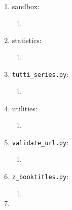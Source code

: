 \begin{enumerate}
	\begin{enumerate} \itemsep -2pt
	\item 
	\end{enumerate}
\item sandbox: \vspace{-0.3cm}
	\begin{enumerate} \itemsep -2pt
	\item 
	\end{enumerate}
\item statistics: \vspace{-0.3cm}
	\begin{enumerate} \itemsep -2pt
	\item 
	\end{enumerate}
\item {\tt tutti\_series.py}: \vspace{-0.3cm}
	\begin{enumerate} \itemsep -2pt
	\item 
	\end{enumerate}
\item utilities: \vspace{-0.3cm}
	\begin{enumerate} \itemsep -2pt
	\item 
	\end{enumerate}
\item {\tt validate\_url.py}: \vspace{-0.3cm}
	\begin{enumerate} \itemsep -2pt
	\item 
	\end{enumerate}
\item {\tt z\_booktitles.py}: \vspace{-0.3cm}
	\begin{enumerate} \itemsep -2pt
	\item 
	\end{enumerate}
\item 
\end{enumerate}

























